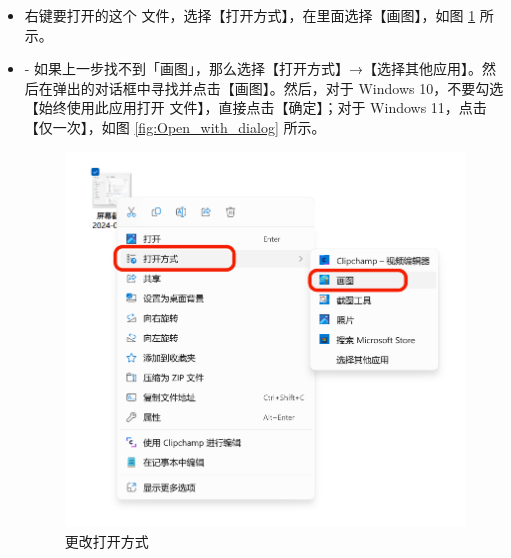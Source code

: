 {{{{\begin{itemize}
  \item 右键要打开的这个  文件，选择【打开方式】，在里面选择【画图】，如图 \ref{fig:Open_with} 所示。
  \item - 如果上一步找不到「画图」，那么选择【打开方式】→【选择其他应用】。然后在弹出的对话框中寻找并点击【画图】。然后，对于 Windows 10，不要勾选【始终使用此应用打开  文件】，直接点击【确定】；对于 Windows 11，点击【仅一次】，如图 \ref{fig:Open_with_dialog} 所示。
    \begin{figure}[htb!]
      \centering
      \begin{minipage}{.55\textwidth}
        \centering
        \includegraphics[width=.98\textwidth]{assets/basic/Open_with.png}
        \caption{更改打开方式}
        \label{fig:Open_with}
      \end{minipage}
      \begin{minipage}{.43\textwidth}

\end{minipage}
\end{figure}
\end{itemize}}}}}

